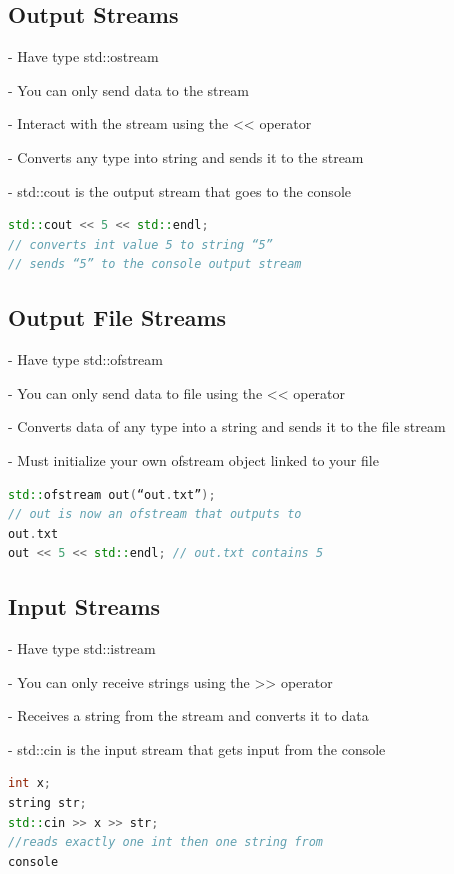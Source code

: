 \documentclass[12pt, a4paper, oneside]{ctexbook}
\begin{document}
\subsection{Output Streams}

- Have type std::ostream

- You can only send data to the stream

- Interact with the stream using the << operator

- Converts any type into string and sends it to the
stream

- std::cout is the output stream that goes to the console

\begin{lstlisting}[language=c++]
std::cout << 5 << std::endl;
// converts int value 5 to string “5”
// sends “5” to the console output stream
\end{lstlisting}


\subsection{Output File Streams}

- Have type std::ofstream

- You can only send data to file using the << operator

- Converts data of any type into a string and sends it
to the file stream

- Must initialize your own ofstream object linked to your
file

\begin{lstlisting}[language=c++]
std::ofstream out(“out.txt”);
// out is now an ofstream that outputs to
out.txt
out << 5 << std::endl; // out.txt contains 5
\end{lstlisting}

\subsection{Input Streams}

- Have type std::istream

- You can only receive strings using the >> operator

- Receives a string from the stream and converts it to
data

- std::cin is the input stream that gets input from the
console

\begin{lstlisting}[language=c++]
int x;
string str;
std::cin >> x >> str;
//reads exactly one int then one string from
console
\end{lstlisting}
\end{document}
